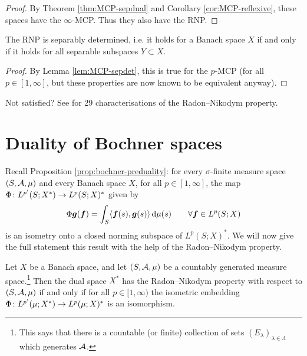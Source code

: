 \begin{proof}
  By Theorem \ref{thm:MCP-sepdual} and Corollary \ref{cor:MCP-reflexive}, these spaces have the $\infty$-MCP.
  Thus they also have the RNP.
\end{proof}

\begin{cor}
  The RNP is separably determined, i.e. it holds for a Banach space $X$ if and only if it holds for all separable subspaces $Y \subset X$.
\end{cor}

\begin{proof}
  By Lemma \ref{lem:MCP-sepdet}, this is true for the $p$-MCP (for all $p \in [1,\infty]$, but these properties are now known to be equivalent anyway). 
\end{proof}

\begin{rmk}
  Not satisfied? See \cite[\textsection VII.6]{DU77} for 29 characterisations of the Radon--Nikodym property.
\end{rmk}

\section{Duality of Bochner spaces}

Recall Proposition \ref{prop:bochner-preduality}: for every $\sigma$-finite measure space $(S,\mathcal{A},\mu)$ and every Banach space $X$, for all $p \in [1,\infty]$, the map $\Phi \colon L^{p'}(S;X^*) \rightarrow L^p(S;X)^*$ given by
\begin{equation*}
  \Phi \bm{g}(\bm{f}) = \int_{S} \langle \bm{f}(s), \bm{g}(s) \rangle \, \mathrm{d}\mu(s) \qquad \forall \bm{f} \in L^p(S;X)
\end{equation*}
is an isometry onto a closed norming subspace of $L^p(S;X)^*$.
We will now give the full statement this result with the help of the Radon--Nikodym property.

\begin{thm}\label{thm:bochner-duality-RNP}
  Let $X$ be a Banach space, and let $(S,\mathcal{A},\mu)$ be a countably generated measure space.\footnote{This says that there is a countable (or finite) collection of sets $(E_{\lambda})_{\lambda \in \Lambda}$ which generates $\mathcal{A}$.}
  Then the dual space $X^*$ has the Radon--Nikodym property with respect to $(S,\mathcal{A},\mu)$ if and only if for all $p \in [1,\infty)$ the isometric embedding $\Phi \colon L^{p'}(\mu;X^*) \rightarrow L^p(\mu;X)^*$ is an isomorphism.
\end{thm}


